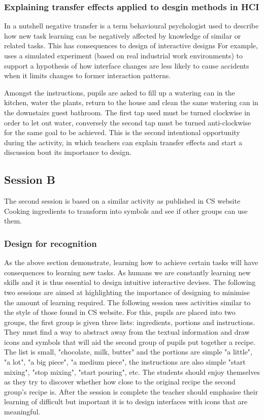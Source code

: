 \documentclass{sig-alternate}
\begin{document}
\subsubsection*{Explaining transfer effects applied to desgin methods in HCI}
In a nutshell negative transfer\cite{Lunchin, Pan2010, Woltz} is a term behavioural psychologist used to describe how new task learning can be negatively affected by knowledge of similar or related tasks.
This has consequences to design of interactive designs \cite{waern1993varieties} For example,\cite{Besnard2005105} uses a simulated experiment (based on real industrial work environments) to support a hypothesis of how interface changes are less likely to cause accidents when it limits changes to former interaction patterns.

Amongst the instructions, pupils are asked to fill up a watering can in the kitchen, water the plants, return to the house and clean the same watering can in the downstairs guest bathroom. The first tap used must be turned clockwise in order to let out water, conversely the second tap must be turned anti-clockwise for the same goal to be achieved. This is the second intentional opportunity during the activity, in which teachers can explain transfer effects and start a discussion bout its importance to design.

\subsection{Session B}
The second session is based on a similar activity as published in {CS website}
Cooking ingredients to transform into symbols and see if other groups can use them.

\subsubsection*{Design for recognition}
 
As the above section demonstrate, learning how to achieve certain tasks will have consequences to learning new tasks. As humans we are constantly learning new skills and it is thus essential to design intuitive interactive devises. The following two sessions are aimed at highlighting the importance of designing to minimise the amount of learning required. The following session uses activities similar to the style of those found in {CS website}.
For this, pupils are placed into two groups, the first group is given three lists: ingredients, portions and instructions. They must find a way to abstract away from the textual information and draw icons and symbols that will aid the second group of pupils put together a recipe. The list is small, "chocolate, milk, butter" and the portions are simple "a little", "a lot", "a big piece", "a medium piece", the instructions are also simple "start mixing", "stop mixing", "start pouring", etc. The students should enjoy themselves as they try to discover whether how close to the original recipe the second group's recipe is. After the session is complete the teacher should emphasise their learning of difficult but important it is to design interfaces with icons that are meaningful. 
\end{document}
